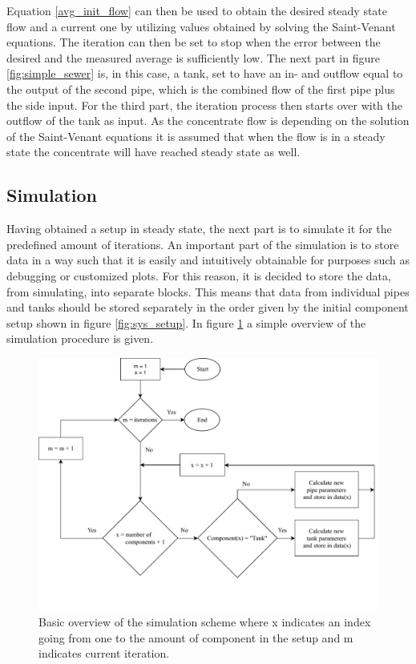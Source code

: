 Equation \ref{avg_init_flow} can then be used to obtain the desired steady state flow and a current one by utilizing values obtained by solving the Saint-Venant equations. The iteration can then be set to stop when the error between the desired and the measured average is sufficiently low. The next part in figure \ref {fig:simple_sewer} is, in this case, a tank, set to have an in- and outflow equal to the output of the second pipe, which is the combined flow of the first pipe plus the side input. For the third part, the iteration process then starts over with the outflow of the tank as input.
As the concentrate flow is depending on the solution of the Saint-Venant equations it is assumed that when the flow is in a steady state the concentrate will have reached steady state as well.

\subsection*{Simulation}

Having obtained a setup in steady state, the next part is to simulate it for the predefined amount of iterations. An important part of the simulation is to store data in a way such that it is easily and intuitively obtainable for purposes such as debugging or customized plots. For this reason, it is decided to store the data, from simulating, into separate blocks. This means that data from individual pipes and tanks should be stored separately in the order given by the initial component setup shown in figure \ref{fig:sys_setup}. In figure \ref{fig:simple_simulation} a simple overview of the simulation procedure is given.   

\begin{figure}[H]
\centering
\includegraphics[width=1 \textwidth]{report/simulation/pictures/simple_simulation.pdf}
\caption{Basic overview of the simulation scheme where x indicates an index going from one to the amount of component in the setup and m indicates current iteration.}
\label{fig:simple_simulation}
\end{figure}

